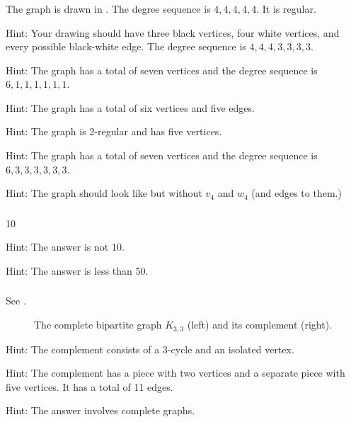 \subsubsection*{ \answers}
\begin{apart}
    \item The graph is drawn in .  The degree sequence is $4,4,4,4,4$.  It is regular.
    \item Hint: Your drawing should have three black vertices, four white vertices, and every possible black-white edge. The degree sequence is $4,4,4,3,3,3,3$. 
    \item Hint: The graph has a total of seven vertices and the degree sequence is $6,1,1,1,1,1,1$.
    \item Hint: The graph has a total of six vertices and five edges.
    \item Hint: The graph is 2-regular and has five vertices.
    \item Hint: The graph has a total of seven vertices and the degree sequence is $6,3,3,3,3,3,3$.
    \item Hint: The graph should look like  but without $v_4$ and $w_4$ (and edges to them.)
\end{apart}

\subsubsection*{ \answers}
    \begin{apart}
        \item 10
        \item Hint: The answer is not 10.
        \item Hint: The answer is less than 50.
    \end{apart}

\subsubsection*{ \answers}
\begin{apart}
    \item See .

    \begin{figure}[hbtp]
        \centering
        
        \caption{The complete bipartite graph $K_{3,3}$ (left) and its complement (right).}
        \label{fig_K33_comp}
    \end{figure}

    \item Hint: The complement consists of a 3-cycle and an isolated vertex.
    \item Hint: The complement has a piece with two vertices and a separate piece with five vertices.  It has a total of 11 edges.
    \item Hint: The answer involves complete graphs.
\end{apart}

